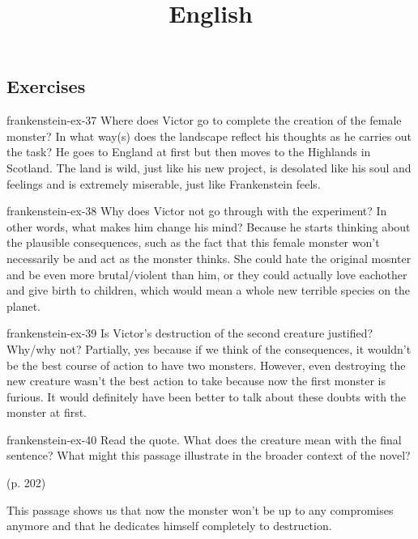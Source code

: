 \documentclass[preview]{standalone}
\begin{document}
\title{English}
\genpage

\subsection{Exercises}

\begin{snippetexercise}{frankenstein-ex-37}
    {Where does Victor go to complete the creation of the female monster? In what way(s) does the
    landscape reflect his thoughts as he carries out the task?}
    He goes to England at first but then moves to the Highlands in Scotland.
    The land is wild, just like his new project, is desolated like his soul
    and feelings and is extremely miserable, just like Frankenstein feels.
\end{snippetexercise}

\begin{snippetexercise}{frankenstein-ex-38}
    {Why does Victor not go through with the experiment? In other words, what makes him change
    his mind?}
    Because he starts thinking about the plausible consequences, such as the fact
    that this female monster won't necessarily be and act as the monster thinks.
    She could hate the original mosnter and be even more brutal/violent than him,
    or they could actually love eachother and give birth to children, which
    would mean a whole new terrible species on the planet.
\end{snippetexercise}

\begin{snippetexercise}{frankenstein-ex-39}
    {Is Victor's destruction of the second creature justified? Why/why not?}
    Partially, yes because if we think of the consequences, it wouldn't be the best
    course of action to have two monsters. However, even destroying the new creature
    wasn't the best action to take because now the first monster is furious.
    It would definitely have been better to talk about these doubts with the monster
    at first. 
\end{snippetexercise}

\begin{snippetexercise}{frankenstein-ex-40}
    {Read the quote. What does the creature mean with the final sentence? What might this passage
    illustrate in the broader context of the novel?}
    \begin{center}
         (p. 202)
    \end{center}
    This passage shows us that now the monster won't be up to any compromises
    anymore and that he dedicates himself completely to destruction.
\end{snippetexercise}
\end{document}
